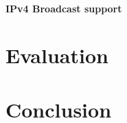 \documentclass{l4proj}
\begin{document}
\subsubsection{IPv4 Broadcast support} %
\label{sub:ipv4_broadcast_support}






\chapter{Evaluation} %
\label{cha:evaluation}






\chapter{Conclusion} %
\label{cha:conclusion}




\begin{appendices}


\end{appendices}




\end{document}
